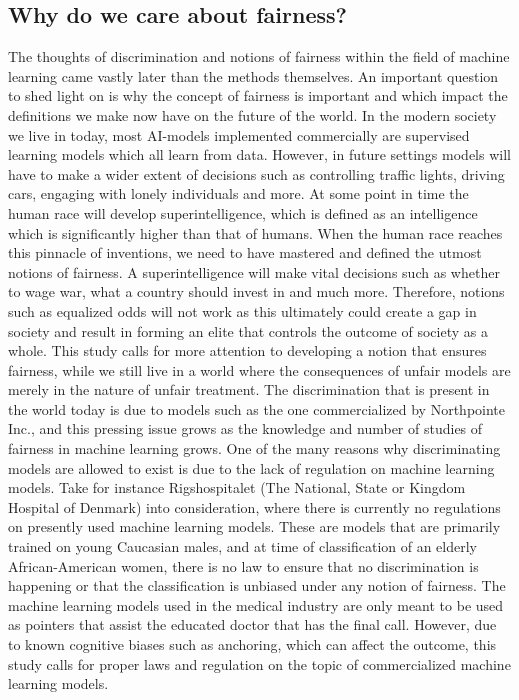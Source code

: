 \documentclass[11pt, fleqn, titlepage]{article}
\begin{document}
	\subsection{Why do we care about fairness?}\label{why_do_we_care}
	The thoughts of discrimination and notions of fairness within the field of machine learning came vastly later than the methods themselves. An important question to shed light on is why the concept of fairness is important and which impact the definitions we make now have on the future of the world. In the modern society we live in today, most AI-models implemented commercially are supervised learning models which all learn from data. However, in future settings models will have to make a wider extent of decisions such as controlling traffic lights, driving cars, engaging with lonely individuals and more. At some point in time the human race will develop superintelligence, which is defined as an intelligence which is significantly higher than that of humans. \cite{superint} When the human race reaches this pinnacle of inventions, we need to have mastered and defined the utmost notions of fairness. A superintelligence will make vital decisions such as whether to wage war, what a country should invest in and much more. Therefore, notions such as equalized odds will not work as this ultimately could create a gap in society and result in forming an elite that controls the outcome of society as a whole. This study calls for more attention to developing a notion that ensures fairness, while we still live in a world where the consequences of unfair models are merely in the nature of unfair treatment. The discrimination that is present in the world today is due to models such as the one commercialized by Northpointe Inc., and this pressing issue grows as the knowledge and number of studies of fairness in machine learning grows. One of the many reasons why discriminating models are allowed to exist is due to the lack of regulation on machine learning models. Take for instance Rigshospitalet (The National, State or Kingdom Hospital of Denmark) into consideration, where there is currently no regulations on presently used  machine learning models. These are models that are primarily trained on young Caucasian males, and at time of classification of an elderly African-American women, there is no law to ensure that no discrimination is happening or that the classification is unbiased under any notion of fairness. The machine learning models used in the medical industry are only meant to be used as pointers that assist the educated doctor that has the final call. However, due to known cognitive biases such as anchoring, which can affect the outcome, this study calls for proper laws and regulation on the topic of commercialized machine learning models.
\end{document}

